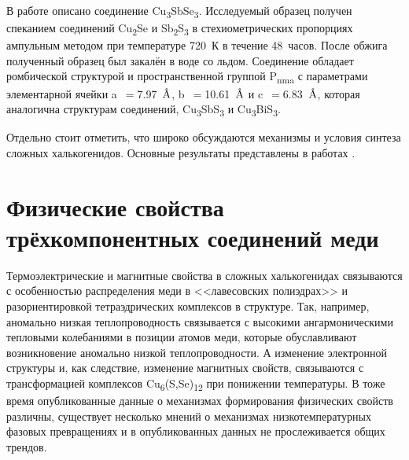В работе \cite{31_Whitfield_1980} описано соединение Cu\textsubscript{3}SbSe\textsubscript{3}. Исследуемый образец получен спеканием соединений Cu\textsubscript{2}Se и Sb\textsubscript{2}S\textsubscript{3} в стехиометрических пропорциях ампульным методом при температуре 720~К в течение 48~часов. После обжига полученный образец был закалён в воде со льдом. Соединение обладает ромбической структурой и пространственной группой P\textsubscript{nma} с параметрами элементарной ячейки a~$=$7.97~$\mbox{\normalfont\AA}$, b~$=$10.61~$\mbox{\normalfont\AA}$ и c~$=$6.83~$\mbox{\normalfont\AA}$, которая аналогична структурам соединений,  Cu\textsubscript{3}SbS\textsubscript{3} и  Cu\textsubscript{3}BiS\textsubscript{3}.


Отдельно стоит отметить, что широко обсуждаются механизмы и условия синтеза сложных халькогенидов. Основные результаты представлены в работах \cite{Sis_Frost2002,sis_karup59new,sis_Mueller2002,sis_Mueller2003,sis_Raghavan2004,sis_seal1990tetrahedrite,sis_Skinner1972,sis_Taras_Bryndzia_1988,sis_Tomkins2006,sis1_1347-4065-8-4-443,sis1_BALAZ1995375,sis1_Braga2008,sis1_Pfitzner:se0205,sis1_WELLER2017794}.
\newpage


\section{Физические свойства трёхкомпонентных соединений меди} \label{sect1_3}

Термоэлектрические и магнитные свойства в сложных халькогенидах связываются с особенностью распределения меди в <<лавесовских полиэдрах>>  и разориентировкой тетраэдрических комплексов в структуре. Так, например, аномально низкая теплопроводность связывается с высокими ангармоническими тепловыми колебаниями в позиции атомов меди\cite{Mishra2017}, которые обуславливают возникновение аномально низкой теплопроводности. А изменение электронной структуры и, как следствие, изменение магнитных свойств, связываются с трансформацией комплексов  Cu\textsubscript{6}(S,Se)\textsubscript{12} при понижении температуры\cite{Gainov2008}. В тоже время опубликованные данные о механизмах формирования физических свойств различны, существует несколько мнений о механизмах низкотемпературных фазовых превращениях и в опубликованных данных не прослеживается общих трендов.


